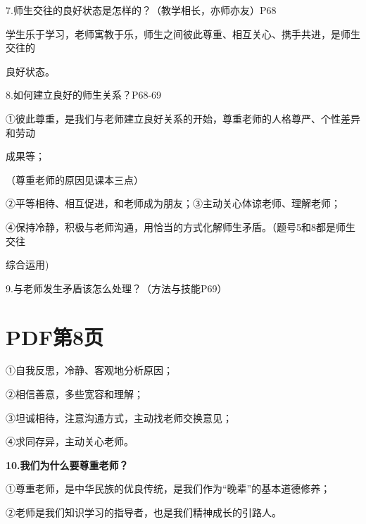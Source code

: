 \documentclass[lang=cn,11pt]{elegantbook}
\newcommand{\daofasym}[1]{{\daofasymbolfont #1}}
\newcommand{\daofasym}[1]{#1}
\begin{document}
7.师生交往的良好状态是怎样的？（教学相长，亦师亦友）P68\par

学生乐于学习，老师寓教于乐，师生之间彼此尊重、相互关心、携手共进，是师生交往的\par

良好状态。\par

8.如何建立良好的师生关系？P68-69\par

\daofasym{①}彼此尊重，是我们与老师建立良好关系的开始，尊重老师的人格尊严、个性差异和劳动\par

成果等；\par

（尊重老师的原因见课本三点）\par

\daofasym{②}平等相待、相互促进，和老师成为朋友；\daofasym{③}主动关心体谅老师、理解老师；\par

\daofasym{④}保持冷静，积极与老师沟通，用恰当的方式化解师生矛盾。（题号5和8都是师生交往\par

综合运用)\par

9.与老师发生矛盾该怎么处理？（方法与技能P69）\par


\section*{PDF第8页}

\daofasym{①}自我反思，冷静、客观地分析原因；\par

\daofasym{②}相信善意，多些宽容和理解；\par

\daofasym{③}坦诚相待，注意沟通方式，主动找老师交换意见；\par

\daofasym{④}求同存异，主动关心老师。\par

\textbf{10.我们为什么要尊重老师？}\par

\daofasym{①}尊重老师，是中华民族的优良传统，是我们作为“晚辈”的基本道德修养；\par

\daofasym{②}老师是我们知识学习的指导者，也是我们精神成长的引路人。\par
\end{document}
